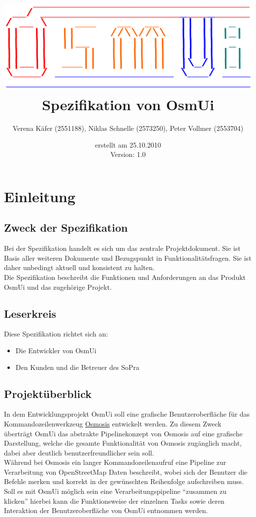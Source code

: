 \documentclass[a4paper,10pt]{scrartcl}
\author{Verena Käfer (2551188), Niklas Schnelle (2573250), Peter Vollmer (2553704)}
\date{erstellt am 25.10.2010\\
Version: 1.0}
\title{\includegraphics[width=15cm]{../projektplan/Logo_Osmui.png} \\ 
Spezifikation von OsmUi}
\begin{document}
\maketitle
\newpage
\tableofcontents
\newpage

\section{Einleitung}
\subsection{Zweck der Spezifikation}
Bei der Spezifikation handelt es sich um das zentrale Projektdokument. Sie ist Basis aller weiteren Dokumente und
Bezugspunkt in Funktionalitätsfragen. Sie ist daher unbedingt aktuell und konsistent zu halten.\\
Die Spezifikation beschreibt die Funktionen und Anforderungen an das Produkt OsmUi und das zugehörige Projekt.
\subsection{Leserkreis}
Diese Spezifikation richtet sich an:
\begin{itemize}
 \item Die Entwickler von OsmUi
 \item Den Kunden und die Betreuer des SoPra
\end{itemize}

\subsection{Projektüberblick}
In dem Entwicklungsprojekt OsmUi soll eine grafische Benutzeroberfläche für das Kommandozeilenwerkzeug \href{http://wiki.openstreetmap.org/wiki/Osmosis}{Osmosis}
entwickelt werden. Zu diesem Zweck überträgt OsmUi das abstrakte Pipelinekonzept von Osmosis auf eine grafische Darstellung, welche die gesamte
Funktionalität von Osmosis zugänglich macht, dabei aber deutlich benutzerfreundlicher sein soll.\\
Während bei Osmosis ein langer Kommandozeilenaufruf eine Pipeline zur Verarbeitung von OpenStreetMap Daten beschreibt, wobei sich der Benutzer die Befehle merken
und korrekt in der gewünschten Reihenfolge aufschreiben muss.\\
Soll es mit OsmUi möglich sein eine Verarbeitungspipeline ``zusammen zu klicken'' hierbei kann die Funktionsweise der einzelnen Tasks sowie deren Interaktion
der Benutzeroberfläche von OsmUi entnommen werden.
\end{document}
